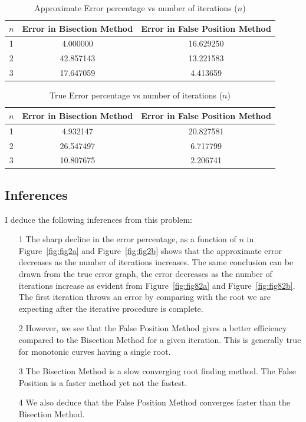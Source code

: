 \documentclass[titlepage, 11pt]{article}
\begin{document}
\begin{table}[!htb]
    \caption{Approximate Error percentage vs number of iterations ($n$)}
    \centering
    \begin{tabular}{ccc}
    \toprule
    \textbf{$n$}& \textbf{Error in Bisection Method }& \textbf{Error in False Position Method }   \\
    \midrule
         1 & 4.000000 &  16.629250\\
         2 & 42.857143 & 13.221583\\
         3 & 17.647059 & 4.413659 \\
    \bottomrule
    \end{tabular}
    \label{tab:tab1}
\end{table}

\begin{table}[!htb]
    \caption{True Error percentage vs number of iterations ($n$)}
    \centering
    \begin{tabular}{ccc}
    \toprule
    \textbf{$n$}& \textbf{Error in Bisection Method}& \textbf{Error in False Position Method}   \\
    \midrule
         1 & 4.932147 &  20.827581\\
         2 & 26.547497 & 6.717799\\
         3 & 10.807675 & 2.206741 \\
    \bottomrule
    \end{tabular}
    \label{tab:tab1}
\end{table}

\subsection{Inferences}
I deduce the following inferences from this problem:
\begin{itemize}
    \item [1] The sharp decline in the error percentage, as a function of $n$ in Figure~\ref{fig:fig2a} and Figure~\ref{fig:fig2b} shows that the approximate error decreases as the number of iterations increases. The same conclusion can be drawn from the true error graph, the error decreases as the number of iterations increase as evident from Figure~\ref{fig:fig82a} and Figure~\ref{fig:fig82b}. The first iteration throws an error by comparing with the root we are expecting after the iterative procedure is complete. 
    \item [2] However, we see that the False Position Method gives a better efficiency compared to the Bisection Method for a given iteration. This is generally true for monotonic curves having a single root.
    \item [3] The Bisection Method is a slow converging root finding method. The False Position is a faster method yet not the fastest. 
    \item [4] We also deduce that the False Position Method converges faster than the Bisection Method. 
\end{itemize}
\end{document}
